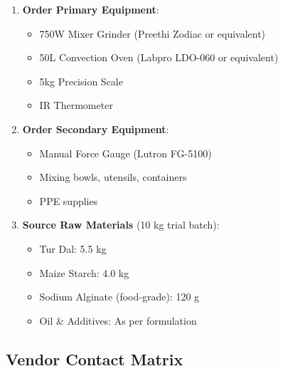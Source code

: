 \documentclass[12pt,a4paper]{article}
\begin{document}
\begin{enumerate}[label=\textbf{\arabic*.}]
    \item \textbf{Order Primary Equipment}:
    \begin{itemize}
        \item[✓] 750W Mixer Grinder (Preethi Zodiac or equivalent)
        \item[✓] 50L Convection Oven (Labpro LDO-060 or equivalent)
        \item[✓] 5kg Precision Scale
        \item[✓] IR Thermometer
    \end{itemize}
    
    \item \textbf{Order Secondary Equipment}:
    \begin{itemize}
        \item[✓] Manual Force Gauge (Lutron FG-5100)
        \item[✓] Mixing bowls, utensils, containers
        \item[✓] PPE supplies
    \end{itemize}
    
    \item \textbf{Source Raw Materials} (10 kg trial batch):
    \begin{itemize}
        \item[✓] Tur Dal: 5.5 kg
        \item[✓] Maize Starch: 4.0 kg
        \item[✓] Sodium Alginate (food-grade): 120 g
        \item[✓] Oil \& Additives: As per formulation
    \end{itemize}
\end{enumerate}

\subsection{Vendor Contact Matrix}
\end{document}
